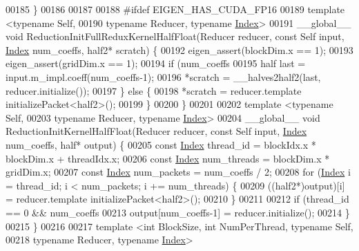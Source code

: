 \begin{DoxyCode}
00185 \}
00186 
00187 
00188 \textcolor{preprocessor}{#ifdef EIGEN\_HAS\_CUDA\_FP16}
00189 \textcolor{keyword}{template} <\textcolor{keyword}{typename} Self,
00190           \textcolor{keyword}{typename} Reducer, \textcolor{keyword}{typename} \hyperlink{namespace_eigen_a62e77e0933482dafde8fe197d9a2cfde}{Index}>
00191 \_\_global\_\_ \textcolor{keywordtype}{void} ReductionInitFullReduxKernelHalfFloat(Reducer reducer, \textcolor{keyword}{const} Self input, 
      \hyperlink{namespace_eigen_a62e77e0933482dafde8fe197d9a2cfde}{Index} num\_coeffs, half2* scratch) \{
00192   eigen\_assert(blockDim.x == 1);
00193   eigen\_assert(gridDim.x == 1);
00194   \textcolor{keywordflow}{if} (num\_coeffs %
00195     half last = input.m\_impl.coeff(num\_coeffs-1);
00196     *scratch = \_\_halves2half2(last, reducer.initialize());
00197   \} \textcolor{keywordflow}{else} \{
00198     *scratch = reducer.template initializePacket<half2>();
00199   \}
00200 \}
00201 
00202 \textcolor{keyword}{template} <\textcolor{keyword}{typename} Self,
00203           \textcolor{keyword}{typename} Reducer, \textcolor{keyword}{typename} \hyperlink{namespace_eigen_a62e77e0933482dafde8fe197d9a2cfde}{Index}>
00204 \_\_global\_\_ \textcolor{keywordtype}{void} ReductionInitKernelHalfFloat(Reducer reducer, \textcolor{keyword}{const} Self input, 
      \hyperlink{namespace_eigen_a62e77e0933482dafde8fe197d9a2cfde}{Index} num\_coeffs, half* output) \{
00205   \textcolor{keyword}{const} \hyperlink{namespace_eigen_a62e77e0933482dafde8fe197d9a2cfde}{Index} thread\_id = blockIdx.x * blockDim.x + threadIdx.x;
00206   \textcolor{keyword}{const} \hyperlink{namespace_eigen_a62e77e0933482dafde8fe197d9a2cfde}{Index} num\_threads = blockDim.x * gridDim.x;
00207   \textcolor{keyword}{const} \hyperlink{namespace_eigen_a62e77e0933482dafde8fe197d9a2cfde}{Index} num\_packets = num\_coeffs / 2;
00208   \textcolor{keywordflow}{for} (\hyperlink{namespace_eigen_a62e77e0933482dafde8fe197d9a2cfde}{Index} i = thread\_id; i < num\_packets; i += num\_threads) \{
00209     ((half2*)output)[i] = reducer.template initializePacket<half2>();
00210   \}
00211 
00212   \textcolor{keywordflow}{if} (thread\_id == 0 && num\_coeffs %
00213     output[num\_coeffs-1] = reducer.initialize();
00214   \}
00215 \}
00216 
00217 \textcolor{keyword}{template} <\textcolor{keywordtype}{int} BlockSize, \textcolor{keywordtype}{int} NumPerThread, \textcolor{keyword}{typename} Self,
00218           \textcolor{keyword}{typename} Reducer, \textcolor{keyword}{typename} \hyperlink{namespace_eigen_a62e77e0933482dafde8fe197d9a2cfde}{Index}>

\end{DoxyCode}
